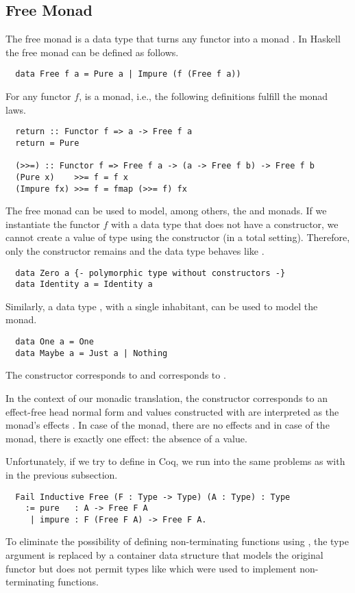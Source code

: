 \subsection{Free Monad}
\label{sec:preliminaries:modeling-effects:free}
The free monad is a data type that turns any functor into a monad \cite[p.~7]{Dylus:2018}.
In Haskell the free monad can be defined as follows.
\begin{verbatim}
  data Free f a = Pure a | Impure (f (Free f a))
\end{verbatim}
For any functor $f$,  is a monad, i.e., the following definitions fulfill the monad laws.
\begin{verbatim}
  return :: Functor f => a -> Free f a
  return = Pure

  (>>=) :: Functor f => Free f a -> (a -> Free f b) -> Free f b
  (Pure x)    >>= f = f x
  (Impure fx) >>= f = fmap (>>= f) fx
\end{verbatim}
The free monad can be used to model, among others, the  and  monads.
If we instantiate the functor $f$ with a data type  that does not have a constructor, we cannot create a value of type  using the  constructor (in a total setting).
Therefore, only the  constructor remains and the data type behaves like .
\begin{verbatim}
  data Zero a {- polymorphic type without constructors -}
  data Identity a = Identity a
\end{verbatim}
Similarly, a data type , with a single inhabitant, can be used to model the  monad.
\begin{verbatim}
  data One a = One
  data Maybe a = Just a | Nothing
\end{verbatim}
The  constructor corresponds to  and  corresponds to .

In the context of our monadic translation, the  constructor corresponds to an effect-free head normal form and values constructed with  are interpreted as the monad's effects \cite[p.~127]{Christiansen:2019}.
In case of the  monad, there are no effects and in case of the  monad, there is exactly one effect: the absence of a value.

Unfortunately, if we try to define  in Coq, we run into the same problems as with  in the previous subsection.
\begin{verbatim}
  Fail Inductive Free (F : Type -> Type) (A : Type) : Type
    := pure   : A -> Free F A
     | impure : F (Free F A) -> Free F A.
\end{verbatim}
To eliminate the possibility of defining non-terminating functions using , the type argument  is replaced by a container data structure that models the original functor but does not permit types like  which were used to implement non-terminating functions.

